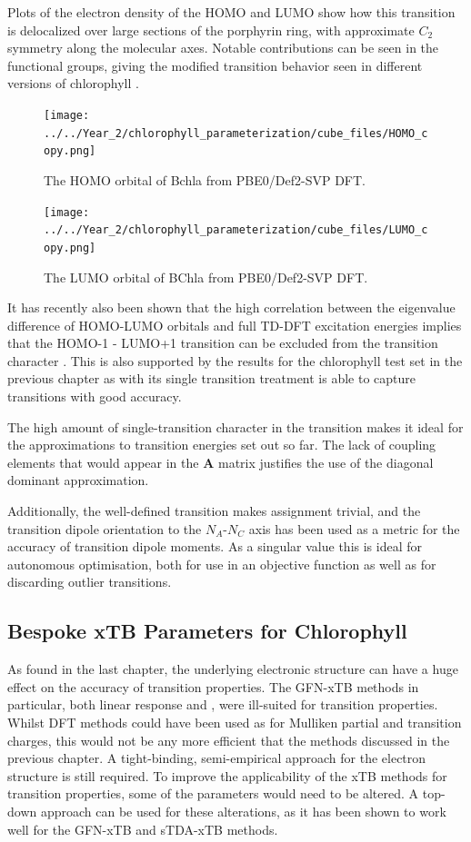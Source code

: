 Plots of the electron density of the HOMO and LUMO show how this transition is delocalized
over large sections of the porphyrin ring, with approximate $C_2$ symmetry along
the molecular axes. Notable contributions can be seen in the functional groups,
giving the modified transition behavior seen in different versions of chlorophyll \cite{BelenOviedo2011}.

\begin{figure}
    \centering
    \texttt{[image: ../../Year\_2/chlorophyll\_parameterization/cube\_files/HOMO\_copy.png]}
    \caption{The HOMO orbital of Bchla from PBE0/Def2-SVP DFT.}
    \label{fig:HOMO}
\end{figure}

\begin{figure}
    \centering
    \texttt{[image: ../../Year\_2/chlorophyll\_parameterization/cube\_files/LUMO\_copy.png]}
    \caption{The LUMO orbital of BChla from PBE0/Def2-SVP DFT.}
\end{figure}

It has recently also been shown that the high correlation between the eigenvalue
difference of HOMO-LUMO orbitals and full TD-DFT excitation energies implies that
the HOMO-1 - LUMO+1 transition can be excluded from the transition character \cite{Saito2020}.
This is also supported by the results for the chlorophyll test set in the previous
chapter as \dscf with its single transition treatment is able to capture \Qy transitions
with good accuracy.

The high amount of single-transition character in the \Qy transition makes it ideal
for the approximations to transition energies set out so far. The lack of coupling
elements that would appear in the $\mathbf{A}$ matrix justifies the use of the diagonal
dominant approximation.

Additionally, the well-defined transition makes assignment trivial, and the transition
dipole orientation to the $N_A$-$N_C$ axis has been used as a metric for the accuracy
of transition dipole moments. As a singular value this is ideal for autonomous optimisation,
both for use in an objective function as well as for discarding outlier transitions.

\subsection{Bespoke xTB Parameters for Chlorophyll}
\label{subsec:chl_method}

As found in the last chapter, the underlying electronic structure can have a huge
effect on the accuracy of transition properties. The GFN-xTB methods in particular,
both linear response and \dxtb, were ill-suited for transition properties. Whilst
DFT methods could have been used as for Mulliken partial and transition charges,
this would not be any more efficient that the \dscf methods discussed in the previous 
chapter. A tight-binding, semi-empirical approach for the electron structure is still 
required. To improve the applicability of the xTB methods for transition properties, 
some of the parameters would need to be altered. A top-down approach can be used 
for these alterations, as it has been shown to work well for the GFN-xTB and sTDA-xTB
methods. 

